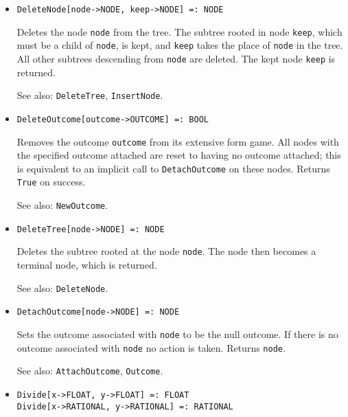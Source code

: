 \begin{itemize}
\item
\protect \large \begin{verbatim}
DeleteNode[node->NODE, keep->NODE] =: NODE
\end{verbatim}\normalsize

\bd
Deletes the node \verb+node+ from the tree.  The
subtree rooted in node \verb+keep+, which must be a child of
\verb+node+, is kept, and \verb+keep+ takes the place of \verb+node+ in
the tree.  All other subtrees descending from \verb+node+ are deleted.
The kept node \verb+keep+ is returned.
\item
[See also:] {\tt DeleteTree}, {\tt InsertNode}.
\ed

\item
\protect \large \begin{verbatim}
DeleteOutcome[outcome->OUTCOME] =: BOOL
\end{verbatim}\normalsize

\bd
Removes the outcome \verb+outcome+ from its extensive
form game.  All nodes with the specified outcome attached are reset to
having no outcome attached; this is equivalent to an implicit call to
{\tt DetachOutcome} on these nodes.  Returns \verb+True+ on success.
\item
[See also:] {\tt NewOutcome}.
\ed

\item
\protect \large \begin{verbatim}
DeleteTree[node->NODE] =: NODE
\end{verbatim}\normalsize

\bd
Deletes the subtree rooted at the node \verb+node+.  The
node then becomes a terminal node, which is returned.
\item
[See also:] {\tt DeleteNode}.
\ed

\item
\protect \large \begin{verbatim}
DetachOutcome[node->NODE] =: NODE
\end{verbatim}\normalsize

\bd
Sets the outcome associated with \verb+node+ to be the
null outcome.  If there is no outcome associated with \verb+node+ no
action is taken.  Returns \verb+node+.
\item
[See also:] {\tt AttachOutcome}, {\tt Outcome}.
\ed

\item 
\protect \large \begin{verbatim}
Divide[x->FLOAT, y->FLOAT] =: FLOAT
Divide[x->RATIONAL, y->RATIONAL] =: RATIONAL
\end{verbatim} \normalsize


\end{itemize}
